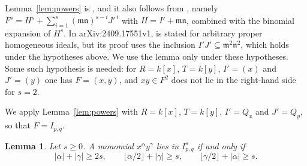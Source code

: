 \documentclass{amsart}
\newtheorem{lemma}[theorem]{Lemma}
\theoremstyle{definition}
\theoremstyle{remark}
\numberwithin{equation}{section}
\newcommand{\mm}{\mathfrak{m}}
\newcommand{\fl}[1]{\lfloor #1\rfloor}
\begin{document}
Lemma~\ref{lem:powers} is \cite[Lemma~2.10]{DNSF}, and it also follows from
\cite[Proposition~4.4(1)]{NV}, namely $F^s=H^s+\sum_{i=1}^{s}(\mm\mathfrak
n)^{s-i}J'^{\,i}$ with $H=I'+\mm\mathfrak n$, combined with the binomial
expansion of $H^s$. In arXiv:2409.17551v1, \cite[Lemma~2.10]{DNSF} is stated
for arbitrary proper homogeneous ideals, but its proof uses the inclusion
$I'J'\subseteq\mm^2\mathfrak n^2$, which holds under the hypotheses above. We
use the lemma only under these hypotheses. Some such hypothesis is needed: for
$R=k[x]$, $T=k[y]$, $I'=(x)$ and $J'=(y)$ one has $F=(x,y)$, and $xy\in F^2$
does not lie in the right-hand side for $s=2$.

We apply Lemma~\ref{lem:powers} with $R=k[x]$, $T=k[y]$, $I'=Q_x$ and $J'=Q_y$,
so that $F=I_{p,q}$.

\begin{lemma}\label{lem:membership}
Let $s\ge0$. A monomial $x^\alpha y^\gamma$ lies in $I_{p,q}^s$ if and only if
\[
  |\alpha|+|\gamma|\ge2s,\qquad
  \fl{\alpha/2}+|\gamma|\ge s,\qquad
  \fl{\gamma/2}+|\alpha|\ge s.
\]
\end{lemma}
\end{document}

